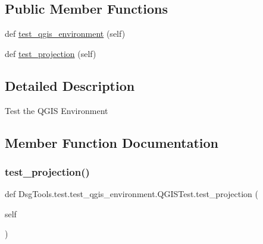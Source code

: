 \subsection*{Public Member Functions}
\begin{DoxyCompactItemize}
\item 
def \mbox{\hyperlink{class_dsg_tools_1_1test_1_1test__qgis__environment_1_1_q_g_i_s_test_a1c1ff4f15c472f2a333cb5acbc96a24e}{test\+\_\+qgis\+\_\+environment}} (self)
\item 
def \mbox{\hyperlink{class_dsg_tools_1_1test_1_1test__qgis__environment_1_1_q_g_i_s_test_adece247b5b08ef4aa06334f0afb20ce1}{test\+\_\+projection}} (self)
\end{DoxyCompactItemize}


\subsection{Detailed Description}
\begin{DoxyVerb}Test the QGIS Environment\end{DoxyVerb}
 

\subsection{Member Function Documentation}
\mbox{\label{class_dsg_tools_1_1test_1_1test__qgis__environment_1_1_q_g_i_s_test_adece247b5b08ef4aa06334f0afb20ce1}} 
\subsubsection{\texorpdfstring{test\+\_\+projection()}{test\_projection()}}
{\footnotesize\ttfamily def Dsg\+Tools.\+test.\+test\+\_\+qgis\+\_\+environment.\+Q\+G\+I\+S\+Test.\+test\+\_\+projection (\begin{DoxyParamCaption}\item[{}]{self }\end{DoxyParamCaption})}

